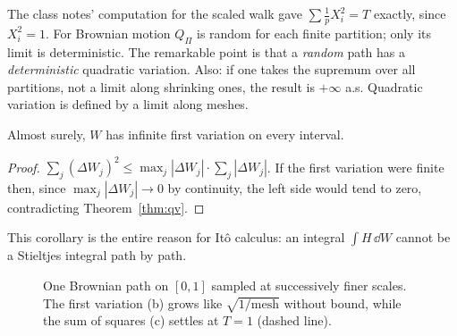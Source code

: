 \begin{pitfall}
The class notes' computation for the scaled walk gave $\sum\frac1pX_i^2=T$ exactly, since $X_i^2=1$. For Brownian motion $Q_\Pi$ is random for each finite partition; only its limit is deterministic. The remarkable point is that a \emph{random} path has a \emph{deterministic} quadratic variation. Also: if one takes the supremum over all partitions, not a limit along shrinking ones, the result is $+\infty$ a.s. Quadratic variation is defined by a limit along meshes.
\end{pitfall}

\begin{corollary}
Almost surely, $W$ has infinite first variation on every interval.
\end{corollary}
\begin{proof}
$\sum_j(\Delta W_j)^2\le\max_j|\Delta W_j|\cdot\sum_j|\Delta W_j|$. If the first variation were finite then, since $\max_j|\Delta W_j|\to0$ by continuity, the left side would tend to zero, contradicting Theorem~\ref{thm:qv}.
\end{proof}

This corollary is the entire reason for It\^o calculus: an integral $\int H\,\dd W$ cannot be a Stieltjes integral path by path.

\begin{figure}[t]
\centering
{}
\caption{One Brownian path on $[0,1]$ sampled at successively finer scales. The first variation (b) grows like $\sqrt{1/\text{mesh}}$ without bound, while the sum of squares (c) settles at $T=1$ (dashed line).}\label{fig:variation}
\end{figure}

